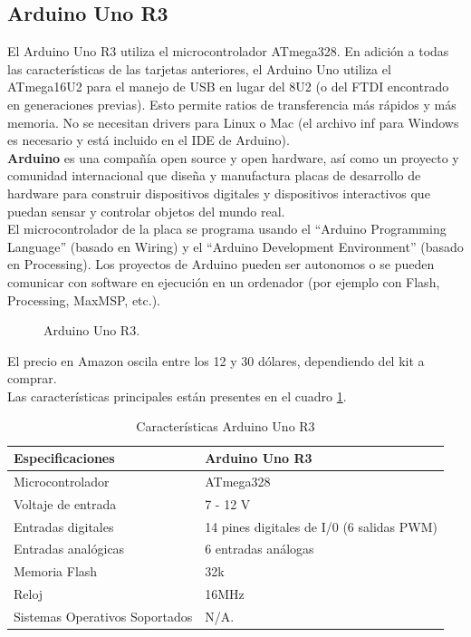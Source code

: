 \documentclass[conference]{IEEEtran}
\begin{document}
	\subsection{Arduino Uno R3}
	El Arduino Uno R3 utiliza el microcontrolador ATmega328. En adición a todas las características de las tarjetas anteriores, el Arduino Uno utiliza el ATmega16U2 para el manejo de USB en lugar del 8U2 (o del FTDI encontrado en generaciones previas). Esto permite ratios de transferencia más rápidos y más memoria. No se necesitan drivers para Linux o Mac (el archivo inf para Windows es necesario y está incluido en el IDE de Arduino).\\
	\textbf{Arduino} es una compañía open source y open hardware, así como un proyecto y comunidad internacional que diseña y manufactura placas de desarrollo de hardware para construir dispositivos digitales y dispositivos interactivos que puedan sensar y controlar objetos del mundo real. \\
	El microcontrolador de la placa se programa usando el “Arduino Programming Language” (basado en Wiring) y el “Arduino Development Environment” (basado en Processing). Los proyectos de Arduino pueden ser autonomos o se pueden comunicar con software en ejecución en un ordenador (por ejemplo con Flash, Processing, MaxMSP, etc.).
	\begin{figure}[h]
	\caption{Arduino Uno R3.}
	\label{fig:ardui}
	\end{figure}
	 El precio en Amazon oscila entre los 12 y 30 dólares, dependiendo del kit a comprar.\\
	Las características principales están presentes en el cuadro \ref{tab:ardui01}.
	\begin{table}[h]
\begin{center}
	\begin{tabular}{|p{2.5cm}|p{5.5cm}|}
	\hline 
	\textbf{Especificaciones} &\textbf{Arduino Uno R3} \\ \hline
	Microcontrolador  &ATmega328 \\\hline
	Voltaje de entrada &7 - 12 V \\\hline
	Entradas digitales &14 pines digitales de I/0 (6 salidas PWM) \\\hline
	Entradas analógicas & 6 entradas análogas \\\hline
	Memoria Flash &32k\\\hline
	Reloj &16MHz \\\hline
	Sistemas Operativos Soportados &N/A.\\\hline
\end{tabular}\vspace{0.25cm}
\caption{Características Arduino Uno R3}
\label{tab:ardui01}
\end{center}
\end{table}
\end{document}
